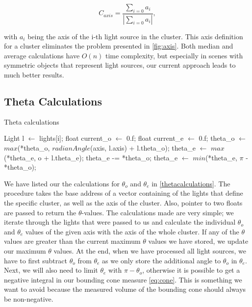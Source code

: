 \begin{equation}
C_{axis} = \frac{\sum_{i = 0} a_i}{|\sum_{i = 0} a_i|},
\end{equation}

with $a_i$ being the axis of the i-th light source in the cluster. This axis definition for a cluster eliminates the problem presented in \ref{fig:axis}. Both median and average calculations have $O(n)$ time complexity, but especially in scenes with symmetric objects that represent light sources, our current approach leads to much better results.

\subsection{Theta Calculations}
\label{subs:theta}

\begin{algorithm}
	\caption{Theta calculations}
	\label{thetacalculations}
	\begin{algorithmic}[1] %
			\State Light l $\gets$ lights[i];
			\State float current\_o $\gets$ 0.f;
			\State float current\_e $\gets$ 0.f;	
			\State 	*theta\_o $\gets$ $max$(*theta\_o, $radianAngle$(axis, l.axis) + l.theta\_o);
			\State *theta\_e $\gets$ $max$(*theta\_e, o + l.theta\_e);
		\EndFor
		\State *theta\_e -= *theta\_o;
		\State *theta\_e $\gets$ $min$(*theta\_e, $\pi$ - *theta\_o);
		\EndProcedure
	\end{algorithmic}
\end{algorithm}

We have listed our the calculations for $\theta_o$ and $\theta_e$ in \ref{thetacalculations}. The procedure takes the base address of a vector containing of the lights that define the specific cluster, as well as the axis of the cluster. Also, pointer to two floats are passed to return the $\theta$-values. The calculations made are very simple; we iterate through the lights that were passed to us and calculate the individual $\theta_o$ and $\theta_e$ values of the given axis with the axis of the whole cluster. If any of the $\theta$ values are greater than the current maximum $\theta$ values we have stored, we update our maximum $\theta$ values. At the end, when we have processed all light sources, we have to first subtract $\theta_o$ from $\theta_e$ as we only store the additional angle to $\theta_o$ in $\theta_e$. Next, we will also need to limit $\theta_e$ with $\pi - \theta_o$, otherwise it is possible to get a negative integral in our bounding cone measure \ref{eq:cone}. This is something we want to avoid because the measured volume of the bounding cone should always be non-negative.

